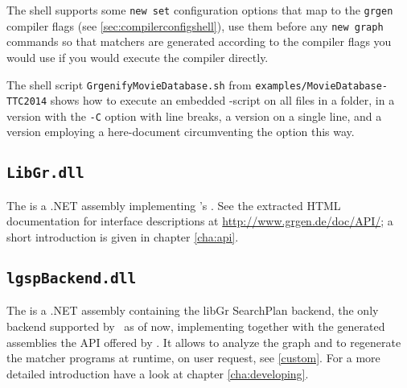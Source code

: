 \begin{note}
The shell supports some \texttt{new set} configuration options that map to the \texttt{grgen} compiler flags (see \ref{sec:compilerconfigshell}), use them before any \texttt{new graph} commands so that matchers are generated according to the compiler flags you would use if you would execute the compiler directly.
\end{note}

\begin{example}
The shell script \texttt{GrgenifyMovieDatabase.sh} from \texttt{examples/MovieDatabase-TTC2014} shows how to execute an embedded \GrShell-script on all files in a folder, in a version with the \texttt{-C} option with line breaks, a version on a single line, and a version employing a here-document circumventing the option this way.
\end{example}

\subsection{\texttt{LibGr.dll}}
\label{sct:API}
The \LibGr{} is a .NET assembly implementing \GrG's .
See the extracted HTML documentation for interface descriptions at \url{http://www.grgen.de/doc/API/};
a short introduction is given in chapter \ref{cha:api}.

\subsection{\texttt{lgspBackend.dll}}
The \LGSPBackend{} is a .NET assembly containing the libGr SearchPlan backend, the only backend supported by \GrG~as of now, implementing together with the generated assemblies the API offered by \LibGr.
It allows to analyze the graph and to regenerate the matcher programs at runtime, on user request, see \ref{custom}.
For a more detailed introduction have a look at chapter \ref{cha:developing}.

